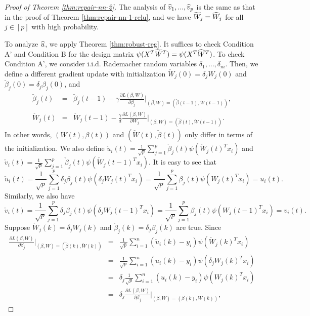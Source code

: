 \begin{proof}[Proof of Theorem \ref{thm:repair-nn-2}]
The analysis of $\widehat{v}_1,...,\widehat{v}_p$ is the same as that in the proof of Theorem \ref{thm:repair-nn-1-relu}, and we have $\widetilde{W}_j=\widehat{W}_j$ for all $j\in[p]$ with high probability.

To analyze $\widehat{u}$, we apply Theorem \ref{thm:robust-reg}. It suffices to check Condition A' and Condition B for the design matrix $\psi(X^T\widetilde{W}^T)=\psi(X^T\widehat{W}^T)$. To check Condition A', we consider i.i.d. Rademacher random variables $\delta_1,...,\delta_m$. Then, we define a different gradient update with initialization $\check{W}_j(0)=\delta_jW_j(0)$ and $\check{\beta}_j(0)=\delta_j\beta_j(0)$, and
\begin{eqnarray*}
\check{\beta}_j(t) &=& \check{\beta}_j(t-1) - \gamma\frac{\partial L(\beta,W)}{\partial \beta_j}|_{(\beta,W)=(\check{\beta}(t-1),\check{W}(t-1))}, \\
\check{W}_j(t) &=& \check{W}_j(t-1) - \frac{\gamma}{d}\frac{\partial L(\beta,W)}{\partial W_j}|_{(\beta,W)=(\check{\beta}(t),\check{W}(t-1))}.
\end{eqnarray*}
In other words, $(W(t),\beta(t))$ and $(\check{W}(t),\check{\beta}(t))$ only differ in terms of the initialization. We also define $\check{u}_i(t)=\frac{1}{\sqrt{p}}\sum_{j=1}^p\check{\beta}_j(t)\psi(\check{W}_j(t)^Tx_i)$ and $\check{v}_i(t)=\frac{1}{\sqrt{p}}\sum_{j=1}^p\check{\beta}_j(t)\psi(\check{W}_j(t-1)^Tx_i)$. It is easy to see that
$$\check{u}_i(t)=\frac{1}{\sqrt{p}}\sum_{j=1}^p\delta_j\beta_j(t)\psi(\delta_jW_j(t)^Tx_i)=\frac{1}{\sqrt{p}}\sum_{j=1}^p\beta_j(t)\psi(W_j(t)^Tx_i)=u_i(t).$$
Similarly, we also have
$$\check{v}_i(t)=\frac{1}{\sqrt{p}}\sum_{j=1}^p\delta_j\beta_j(t)\psi(\delta_jW_j(t-1)^Tx_i)=\frac{1}{\sqrt{p}}\sum_{j=1}^p\beta_j(t)\psi(W_j(t-1)^Tx_i)=v_i(t).$$
Suppose $\check{W}_j(k)=\delta_jW_j(k)$ and $\check{\beta}_j(k)=\delta_j\beta_j(k)$ are true. Since
\begin{eqnarray*}
\frac{\partial L(\beta,W)}{\partial \beta_j}|_{(\beta,W)=(\check{\beta}(k),\check{W}(k))} &=& \frac{1}{\sqrt{p}}\sum_{i=1}^n(\check{u}_i(k)-y_i)\psi(\check{W}_j(k)^Tx_i) \\
&=& \frac{1}{\sqrt{p}}\sum_{i=1}^n({u}_i(k)-y_i)\psi(\delta_j{W}_j(k)^Tx_i) \\
&=& \delta_j\frac{1}{\sqrt{p}}\sum_{i=1}^n({u}_i(k)-y_i)\psi({W}_j(k)^Tx_i) \\
&=& \delta_j\frac{\partial L(\beta,W)}{\partial \beta_j}|_{(\beta,W)=({\beta}(k),{W}(k))},
\end{eqnarray*}

\end{proof}
